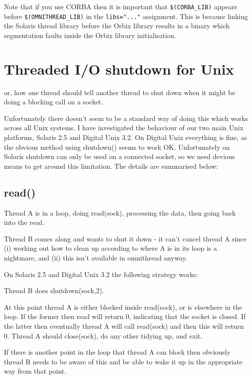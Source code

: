 \documentclass[11pt,twoside,onecolumn]{article}
\begin{document}
Note that if you use CORBA then it is important that {\tt \$(CORBA\_LIB)}
appears before {\tt \$(OMNITHREAD\_LIB)} in the {\tt libs="..."} assignment.
This is because linking the Solaris thread library before the Orbix library
results in a binary which segmentation faults inside the Orbix library
initialisation.



\section{Threaded I/O shutdown for Unix}

or, how one thread should tell another thread to shut down when it might
be doing a blocking call on a socket.

Unfortunately there doesn't seem to be a standard way of doing this which works
across all Unix systems.  I have investigated the behaviour of our two main
Unix platforms, Solaris 2.5 and Digital Unix 3.2.  On Digital Unix everything
is fine, as the obvious method using shutdown() seems to work OK.
Unfortunately on Solaris shutdown can only be used on a connected socket, so we
need devious means to get around this limitation.  The details are summarised
below:


\subsection{read()}

Thread A is in a loop, doing read(sock), processing the data, then going back
into the read.

Thread B comes along and wants to shut it down - it can't cancel thread A since
(i) working out how to clean up according to where A is in its loop is a
nightmare, and (ii) this isn't available in omnithread anyway.

On Solaris 2.5 and Digital Unix 3.2 the following strategy works:

Thread B does shutdown(sock,2).

At this point thread A is either blocked inside read(sock), or is elsewhere in
the loop.  If the former then read will return 0, indicating that the socket is
closed.  If the latter then eventually thread A will call read(sock) and then
this will return 0.  Thread A should close(sock), do any other tidying up, and
exit.

If there is another point in the loop that thread A can block then obviously
thread B needs to be aware of this and be able to wake it up in the appropriate
way from that point.
\end{document}
